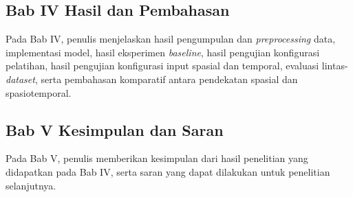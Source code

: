 \subsection{Bab IV Hasil dan Pembahasan}
Pada Bab IV, penulis menjelaskan hasil pengumpulan dan \textit{preprocessing} data, implementasi model, hasil eksperimen \textit{baseline}, hasil pengujian konfigurasi pelatihan, hasil pengujian konfigurasi input spasial dan temporal, evaluasi lintas-\textit{dataset}, serta pembahasan komparatif antara pendekatan spasial dan spasiotemporal. \par

\subsection{Bab V Kesimpulan dan Saran}
Pada Bab V, penulis memberikan kesimpulan dari hasil penelitian yang didapatkan pada Bab IV, serta saran yang dapat dilakukan untuk penelitian selanjutnya.
